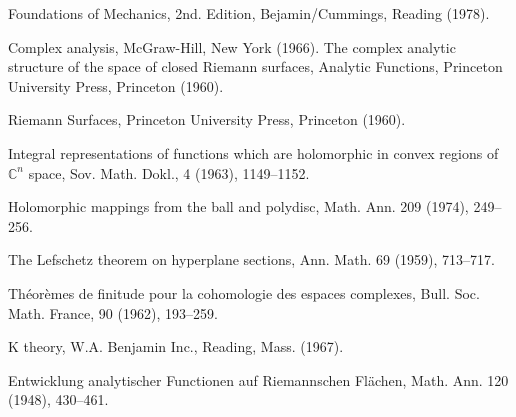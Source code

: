 \begin{sourcebibliography}
 Foundations of Mechanics, 2nd. Edition, Bejamin/Cummings, Reading (1978).
\end{sourcebibliography}
\begin{sourcebibliography}
 Complex analysis, McGraw-Hill, New York (1966).
 The complex analytic structure of the space of closed Riemann surfaces, Analytic Functions, Princeton University Press, Princeton (1960).
\end{sourcebibliography}
\begin{sourcebibliography}
 Riemann Surfaces, Princeton University Press, Princeton (1960).
\end{sourcebibliography}
\begin{sourcebibliography}
 Integral representations of functions which are holomorphic in convex regions of $\mathbb C^n$ space, Sov. Math. Dokl., 4 (1963), 1149--1152.
\end{sourcebibliography}
\begin{sourcebibliography}
 Holomorphic mappings from the ball and polydisc, Math. Ann. 209 (1974), 249--256.
\end{sourcebibliography}
\begin{sourcebibliography}
 The Lefschetz theorem on hyperplane sections, Ann. Math. 69 (1959), 713--717.
\end{sourcebibliography}
\begin{sourcebibliography}
 Th\'eor\`emes de finitude pour la cohomologie des espaces complexes, Bull. Soc. Math. France, 90 (1962), 193--259.
\end{sourcebibliography}
\begin{sourcebibliography}
 K theory, W.A. Benjamin Inc., Reading, Mass. (1967).
\end{sourcebibliography}
\begin{sourcebibliography}
 Entwicklung analytischer Functionen auf Riemannschen Fl\"achen, Math. Ann. 120 (1948), 430--461.
\end{sourcebibliography}
